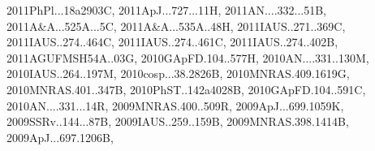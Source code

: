 \documentclass[12pt]{article}
\begin{document}
\begin{enumerate}
\begin{enumerate}
{2011PhPl...18a2903C,%
2011ApJ...727...11H,%
2011AN....332...51B,%
2011A&A...525A...5C,%
2011A&A...535A..48H,%
2011IAUS..271..369C,%
2011IAUS..274..464C,%
2011IAUS..274..461C,%
2011IAUS..274..402B,%
2011AGUFMSH54A..03G,%
2010GApFD.104..577H,%
2010AN....331..130M,%
2010IAUS..264..197M,%
2010cosp...38.2826B,%
2010MNRAS.409.1619G,%
2010MNRAS.401..347B,%
2010PhST..142a4028B,%
2010GApFD.104..591C,%
2010AN....331...14R,%
2009MNRAS.400..509R,%
2009ApJ...699.1059K,%
2009SSRv..144...87B,%
2009IAUS..259..159B,%
2009MNRAS.398.1414B,%
2009ApJ...697.1206B,%
}
\end{enumerate}
\end{enumerate}
\end{document}
